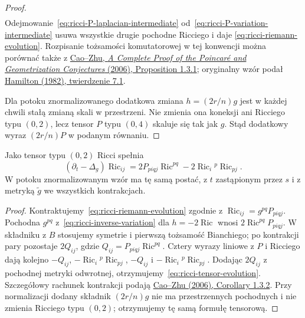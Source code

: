 \begin{proof}
\begin{equation}
\begin{aligned}
 \end{aligned}
\end{equation}
Odejmowanie~\eqref{eq:ricci-P-laplacian-intermediate}
od~\eqref{eq:ricci-P-variation-intermediate}
usuwa wszystkie drugie pochodne Ricciego i daje
\eqref{eq:ricci-riemann-evolution}. Rozpisanie
tożsamości komutatorowej w tej konwencji można
porównać także z
\href{https://archive.intlpress.com/site/pub/files/_fulltext/journals/ajm/2006/0010/0002/AJM-2006-0010-0002-a002.pdf}
{Cao--Zhu, \emph{A Complete Proof of the Poincaré and
Geometrization Conjectures} (2006), Proposition 1.3.1};
oryginalny wzór podał
\href{https://doi.org/10.4310/jdg/1214436922}
{Hamilton (1982), twierdzenie 7.1}.

Dla potoku znormalizowanego dodatkowa zmiana
$h=(2r/n)g$ jest w każdej chwili stałą zmianą
skali w przestrzeni. Nie zmienia ona koneksji ani
Ricciego typu $(0,2)$, lecz tensor $P$ typu $(0,4)$
skaluje się tak jak $g$. Stąd dodatkowy wyraz
$(2r/n)P$ w podanym równaniu.
\end{proof}

\begin{stwierdzenie}
\label{prop:ricci-tensor-evolution}
Jako tensor typu $(0,2)$ Ricci spełnia
\begin{equation}\label{eq:ricci-tensor-evolution}
 (\partial_t-\Delta_g)\operatorname{Ric}_{ij}
 =2P_{p i q j}\operatorname{Ric}^{pq}
  -2\operatorname{Ric}_i{}^p\operatorname{Ric}_{pj}.
\end{equation}
W potoku znormalizowanym wzór ma tę samą postać,
z $t$ zastąpionym przez $s$ i z metryką
$\widetilde g$ we wszystkich kontrakcjach.
\end{stwierdzenie}
\begin{proof}
Kontraktujemy~\eqref{eq:ricci-riemann-evolution}
zgodnie z $\operatorname{Ric}_{ij}=g^{pq}P_{p i q j}$.
Pochodna $g^{pq}$ z~\eqref{eq:ricci-inverse-variation}
dla $h=-2\operatorname{Ric}$ wnosi
$2\operatorname{Ric}^{pq}P_{p i q j}$.
W składniku z $B$ stosujemy symetrie i pierwszą
tożsamość Bianchiego; po kontrakcji pary
pozostaje $2Q_{ij}$, gdzie
$Q_{ij}=P_{p i q j}\operatorname{Ric}^{pq}$.
Cztery wyrazy liniowe z $P$ i Ricciego dają kolejno
$-Q_{ij}$, $-\operatorname{Ric}_i{}^p\operatorname{Ric}_{pj}$,
$-Q_{ij}$ i $-\operatorname{Ric}_i{}^p\operatorname{Ric}_{pj}$.
Dodając $2Q_{ij}$ z pochodnej metryki odwrotnej,
otrzymujemy~\eqref{eq:ricci-tensor-evolution}.
Szczegółowy rachunek kontrakcji podają
\href{https://archive.intlpress.com/site/pub/files/_fulltext/journals/ajm/2006/0010/0002/AJM-2006-0010-0002-a002.pdf}
{Cao--Zhu (2006), Corollary 1.3.2}.
Przy normalizacji dodany składnik $(2r/n)g$
nie ma przestrzennych pochodnych i nie zmienia
Ricciego typu $(0,2)$; otrzymujemy tę samą
formułę tensorową.
\end{proof}

